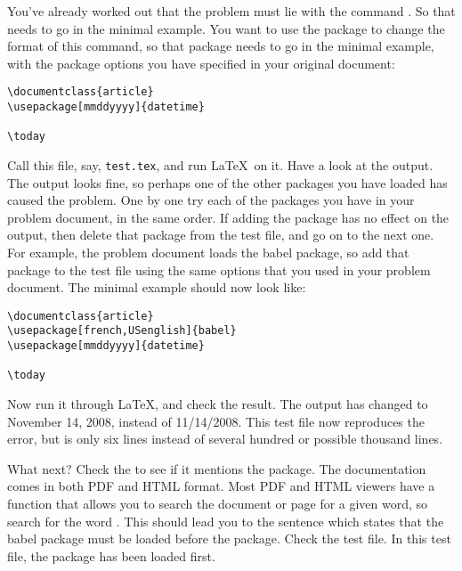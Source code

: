 You've already worked out that the problem must lie with the command
. So that needs to go in the minimal example. You want to use
the  package to change the format of this command, so that
package needs to go in the minimal example, with the package options
you have specified in your original document:
\begin{verbatim}
\documentclass{article}
\usepackage[mmddyyyy]{datetime}

\today

\end{verbatim}

Call this file, say, \texttt{test.tex}, and run \LaTeX\ on it. Have a look at
the output. The output looks fine, so perhaps one of the other
packages you have loaded has caused the problem. One by one try each
of the packages you have in your problem document, in the same
order. If adding the package has no effect on the output, then
delete that package from the test file, and go on to the next one.
For example, the problem document loads the babel package, so add
that package to the test file using the same options that you used
in your problem document. The minimal example should now look like: 
\begin{verbatim}
\documentclass{article}
\usepackage[french,USenglish]{babel}
\usepackage[mmddyyyy]{datetime}

\today

\end{verbatim}
Now run it through \LaTeX, and check the result. The output has
changed to November 14, 2008, instead of 11/14/2008. This test file
now reproduces the error, but is only six lines instead of several
hundred or possible thousand lines. 

What next? Check the 
 to see if it mentions
the  package. The  documentation comes in both PDF and
HTML format. Most PDF and HTML viewers have a function that allows
you to search the document or page for a given word, so search for
the word . This should lead you to the sentence which states
that the babel package must be loaded before the  package.
Check the test file. In this test file, the  package has been
loaded first.

